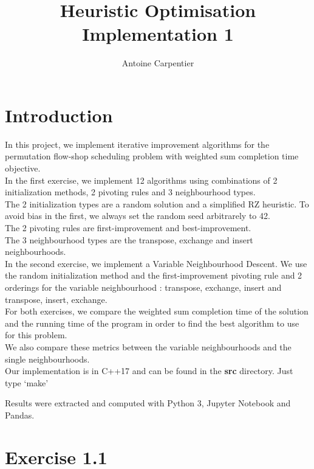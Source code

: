 \documentclass[a4paper,10pt]{article}
\title{Heuristic Optimisation\\Implementation 1}
\author{Antoine Carpentier}
\begin{document}
\maketitle

\section{Introduction}

In this project, we implement iterative improvement algorithms for the permutation flow-shop scheduling problem with weighted sum completion time objective. \\

In the first exercise, we implement 12 algorithms using combinations of 2 initialization methods, 2 pivoting rules and 3 neighbourhood types. \\
The 2 initialization types are a random solution and a simplified RZ heuristic. To avoid bias in the first, we always set the random seed arbitrarely to 42. \\
The 2 pivoting rules are first-improvement and best-improvement. \\
The 3 neighbourhood types are the transpose, exchange and insert neighbourhoods. \\

In the second exercise, we implement a Variable Neighbourhood Descent. We use the random initialization method and the first-improvement pivoting rule and 2 orderings for the variable neighbourhood : transpose, exchange, insert and transpose, insert, exchange. \\

For both exercises, we compare the weighted sum completion time of the solution and the running time of the program in order to find the best algorithm to use for this problem. \\

We also compare these metrics between the variable neighbourhoods and the single neighbourhoods. \\

Our implementation is in C++17 and can be found in the \textbf{src} directory. Just type `make'

Results were extracted and computed with Python 3, Jupyter Notebook and Pandas.

\section{Exercise 1.1}
\end{document}
